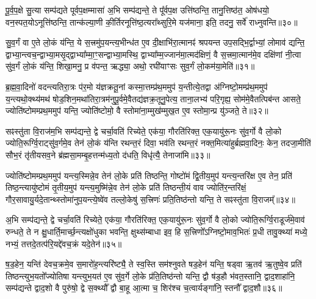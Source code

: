 पू॒र्व॒प॒क्षे सु॒त्या सम्प॑द्यते पूर्वप॒क्षम्मासा॑ अ॒भि सम्प॑द्यन्ते॒ ते पू᳚र्वप॒क्ष उत्ति॑ष्ठन्ति॒ तानु॒त्तिष्ठ॑त॒ ओष॑धयो॒ वन॒स्पत॒यो\-ऽनूत्ति॑ष्ठन्ति॒ तान्क॑ल्या॒णी की॒र्तिरनूत्ति॑ष्ठ॒त्यरा᳚थ्सुरि॒मे यज॑माना॒ इति॒ तदनु॒ सर्वे॑ राध्नुवन्ति॥३०॥

{\anuvakamend[{ए॒तच्छ॒म्बट्कु॑र्वन्ति॒ तेषा॒ञ्चतु॑स्त्रिꣳशच्च॥८॥}]}

सु॒व॒र्गं वा ए॒ते लो॒कं य॑न्ति॒ ये स॒त्त्रमु॑प॒यन्त्य॒भीन्ध॑त ए॒व दी॒क्षाभि॑रा॒त्मानꣴ॑ श्रपयन्त उप॒सद्भि॒र्द्वाभ्यां॒ लोमाव॑ द्यन्ति॒ द्वाभ्या॒न्त्वच॒न्द्वाभ्या॒मसृ॒द्द्वाभ्या᳚म्मा॒ꣳ॒सन्द्वाभ्या॒मस्थि॒ द्वाभ्या᳚म्म॒ज्जान॑मा॒त्मद॑क्षिणं॒ वै स॒त्त्रमा॒त्मान॑मे॒व दक्षि॑णां नी॒त्वा सु॑व॒र्गं लो॒कं य॑न्ति॒ शिखा॒मनु॒ प्र व॑पन्त॒ ऋद्ध्या॒ अथो॒ रघी॑याꣳसः सुव॒र्गं लो॒कम॑या॒मेति॑॥३१॥

{\anuvakamend[{सु॒व॒र्गम्प॑ञ्चा॒शत्॥९॥}]}

ब्र॒ह्म॒वा॒दिनो॑ वदन्त्यतिरा॒त्रः प॑र॒मो य॑ज्ञक्रतू॒नां कस्मा॒त्तम्प्र॑थ॒ममुप॑ य॒न्तीत्ये॒तद्वा अ॑ग्निष्टो॒मम्प्र॑थ॒ममुप॑ य॒न्त्यथो॒क्थ्य॑मथ॑ षोड॒शिन॒मथा॑तिरा॒त्रम॑नुपू॒र्वमे॒वैतद्य॑ज्ञक्र॒तूनु॒पेत्य॒ ताना॒लभ्य॑ परि॒गृह्य॒ सोम॑मे॒वैतत्पिब॑न्त आसते॒ ज्योति॑ष्टोमम्प्रथ॒ममुप॑ यन्ति॒ ज्योति॑ष्टोमो॒ वै स्तोमा॑ना॒म्मुख॑म्मुख॒त ए॒व स्तोमा॒न्प्र यु॑ञ्जते॒ ते॥३२॥

सꣴस्तु॑ता वि॒राज॑म॒भि सम्प॑द्यन्ते॒ द्वे चर्चा॒वति॑ रिच्येते॒ एक॑या॒ गौरति॑रिक्त॒ एक॒यायु॑रू॒नः सु॑व॒र्गो वै लो॒को ज्योति॒रूर्ग्वि॒राट्सु॑व॒र्गमे॒व तेन॑ लो॒कं य॑न्ति रथन्त॒रं दिवा॒ भव॑ति रथन्त॒रं नक्त॒मित्या॑हुर्ब्रह्मवा॒दिनः॒ केन॒ तदजा॒मीति॑ सौभ॒रं तृ॑तीयसव॒ने ब्र॑ह्मसा॒मम्बृ॒हत्तन्म॑ध्य॒तो द॑धति॒ विधृ॑त्यै॒ तेनाजा॑मि॥३३॥

{\anuvakamend[{त एका॒न्नप॑ञ्चा॒शच्च॑॥10॥}]}

ज्योति॑ष्टोमम्प्रथ॒ममुप॑ यन्त्य॒स्मिन्ने॒व तेन॑ लो॒के प्रति॑ तिष्ठन्ति॒ गोष्टो॑मं द्वि॒तीय॒मुप॑ यन्त्य॒न्तरि॑क्ष ए॒व तेन॒ प्रति॑ तिष्ठ॒न्त्यायु॑ष्टोमं तृ॒तीय॒मुप॑ यन्त्य॒मुष्मि॑न्ने॒व तेन॑ लो॒के प्रति॑ तिष्ठन्ती॒यं वाव ज्योति॑र॒न्तरि॑क्षं॒ गौर॒सावायु॒र्यदे॒तान्थ्स्तोमा॑नुप॒यन्त्ये॒ष्वे॑व तल्लो॒केषु॑ स॒त्त्रिणः॑ प्रति॒तिष्ठ॑न्तो यन्ति॒ ते सꣴस्तु॑ता वि॒राजम्᳚॥३४॥

अ॒भि सम्प॑द्यन्ते॒ द्वे चर्चा॒वति॑ रिच्येते॒ एक॑या॒ गौरति॑रिक्त॒ एक॒यायु॑रू॒नः सु॑व॒र्गो वै लो॒को ज्योति॒रूर्ग्वि॒राडूर्ज॑मे॒वाव॑ रुन्धते॒ ते न क्षु॒धार्ति॒मार्च्छ॒न्त्यक्षो॑धुका भवन्ति॒ क्षुथ्स॑म्बाधा इव॒ हि स॒त्त्रिणो᳚\-ऽग्निष्टो॒माव॒भितः॑ प्र॒धी तावु॒क्थ्या॑ मध्ये॒ नभ्यं॒ तत्तदे॒तत्प॑रि॒यद्दे॑वच॒क्रं यदे॒तेन॑॥३५॥

ष॒ड॒हेन॒ यन्ति॑ देवच॒क्रमे॒व स॒मारो॑ह॒न्त्यरि॑ष्ट्यै॒ ते स्व॒स्ति सम॑श्नुवते षड॒हेन॑ यन्ति॒ षड्वा ऋ॒तव॑ ऋ॒तुष्वे॒व प्रति॑ तिष्ठन्त्युभ॒यतो᳚ज्योतिषा यन्त्युभ॒यत॑ ए॒व सु॑व॒र्गे लो॒के प्र॑ति॒तिष्ठ॑न्तो यन्ति॒ द्वौ ष॑ड॒हौ भ॑वत॒स्तानि॒ द्वाद॒शाहा॑नि॒ सम्प॑द्यन्ते द्वाद॒शो वै पुरु॑षो॒ द्वे स॒क्थ्यौ᳚ द्वौ बा॒हू आ॒त्मा च॒ शिर॑श्च च॒त्वार्यङ्गा॑नि॒ स्तनौ᳚ द्वाद॒शौ॥३६॥

